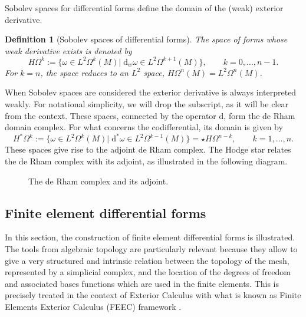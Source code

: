 \documentclass{elsarticle}
\newtheorem{definition}{Definition}
\renewcommand\d{\ensuremath{\mathrm{d}}}
\begin{document}
Sobolev spaces for differential forms define the domain of the (weak) exterior derivative. 
\begin{definition}[Sobolev spaces of differential forms]
The space of forms whose weak derivative exists is denoted by
\begin{equation*}
    H\Omega^k := \{\omega \in L^2 \Omega^k(M) \vert \; \d_w{\omega} \in L^2 \Omega^{k+1}(M)\}, \qquad k=0, \dots, n-1.
\end{equation*}
For $k=n$, the space reduces to an $L^2$ space, $H\Omega^n(M) = L^2\Omega^n(M)$.
\end{definition}
When Sobolev spaces are considered the exterior derivative is always interpreted weakly. For notational simplicity, we will drop the subscript, as it will be clear from the context. These spaces, connected by the operator $\d$, form the de Rham domain complex. For what concerns the codifferential, its domain is given by
\begin{equation}
    H^*\Omega^k := \{\omega \in L^2 \Omega^k(M) \vert \; \d^*{\omega} \in L^2 \Omega^{k-1}(M)\}=\star H\Omega^{n-k}, \qquad k=1, \dots, n.
\end{equation}
These spaces give rise to the adjoint de Rham complex. The Hodge star relates the de Rham complex with its adjoint, as illustrated in the following diagram.
\begin{figure}[h]
\centering
{} 
\caption{The de Rham complex and its adjoint.}
\label{fig:cd_deRham}
\end{figure}

\subsection{Finite element differential forms}

In this section, the construction of finite element differential forms is illustrated. The tools from algebraic topology are particularly relevant because they allow to give a very structured and intrinsic relation between the topology of the mesh, represented by a simplicial complex, and the location of the degrees of freedom and associated bases functions which are used in the finite elements. This is precisely treated in the context of Exterior Calculus with what is known as Finite Elements Exterior Calculus (FEEC)  framework \cite{arnold2006acta,arnold2018finite}. \\
\end{document}
